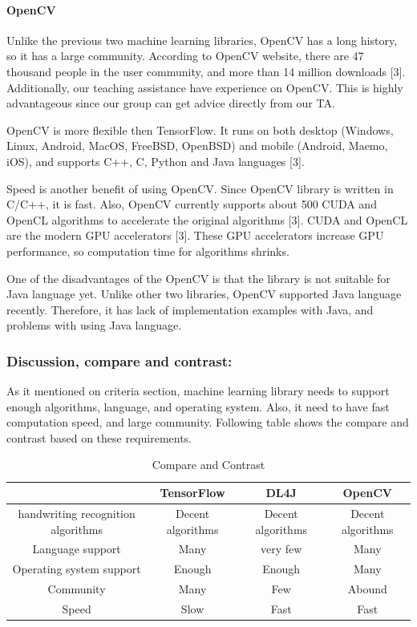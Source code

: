 \documentclass[article, onecolumn, draftclsnofoot,10pt, compsoc]{IEEEtran}
\begin{document}
\paragraph{OpenCV}
Unlike the previous two machine learning libraries, OpenCV has a long history, so it has a large community. According to OpenCV website, there are 47 thousand people in the user community, and more than 14 million downloads [3]. Additionally, our teaching assistance have experience on OpenCV. This is highly advantageous since our group can get advice directly from our TA.

OpenCV is more flexible then TensorFlow. It runs on both desktop (Windows, Linux, Android, MacOS, FreeBSD, OpenBSD) and mobile (Android, Maemo, iOS), and supports C++, C, Python and Java languages [3].

Speed is another benefit of using OpenCV. Since OpenCV library is written in C/C++, it is fast. Also, OpenCV currently supports about 500 CUDA and OpenCL algorithms to accelerate the original algorithms [3]. CUDA and OpenCL are the modern GPU accelerators [3]. These GPU accelerators increase GPU performance, so computation time for algorithms shrinks.

One of the disadvantages of the OpenCV is that the library is not suitable for Java language yet. Unlike other two libraries, OpenCV supported Java language recently. Therefore, it has lack of implementation examples with Java, and problems with using Java language.


\subsubsection{Discussion, compare and contrast:}
As it mentioned on criteria section, machine learning library needs to support enough algorithms, language, and operating system. Also, it need to have fast computation speed, and large community. Following table shows the compare and contrast based on these requirements.

\begin{table}[h]
\centering
\begin{tabular}{ | c | c | c | c |}
\hline
 & TensorFlow & DL4J & OpenCV\\ 
\hline
handwriting recognition algorithms & Decent algorithms & Decent algorithms & Decent algorithms \\ 
\hline
Language support & Many & very few & Many\\ 
\hline
Operating system support & Enough & Enough & Many\\ 
\hline
Community & Many & Few & Abound\\ 
\hline  
Speed & Slow & Fast & Fast\\ 
\hline  
\end{tabular}
\caption{Compare and Contrast}
\label{table:1}
\end{table}
\end{document}
